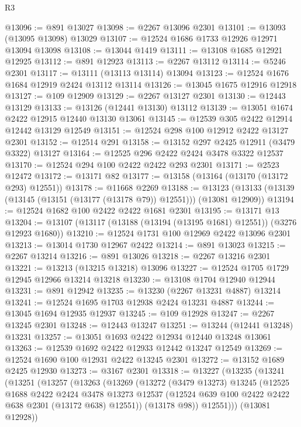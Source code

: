 \begin{lexlean}{R3}
\begin{coremodule}
@13096 := @891 @13027
@13098 := @2267 @13096 @2301
@13101 := @13093 (@13095 @13098) @13029
@13107 := @12524 @1686 @1733 @12926 @12971 @13094 @13098
@13108 := @13044 @1419
@13111 := @13108 @1685 @12921 @12925
@13112 := @891 @12923
@13113 := @2267 @13112
@13114 := @5246 @2301
@13117 := @13111 (@13113 @13114) @13094
@13123 := @12524 @1676 @1684 @12919 @2424 @13112 @13114
@13126 := @13045 @1675 @12916 @12918
@13127 := @109 @12909
@13129 := @2267 @13127 @2301
@13130 := @12443 @13129
@13133 := @13126 (@12441 @13130) @13112
@13139 := @13051 @1674 @2422 @12915 @12440 @13130 @13061
@13145 := @12539 @305 @2422 @12914 @12442 @13129 @12549
@13151 := @12524 @298 @100 @12912 @2422 @13127 @2301
@13152 := @12514 @291
@13158 := @13152 @297 @2425 @12911 (@3479 @3322) @13127
@13164 := @12525 @296 @2422 @2424 @3478 @3322 @12537
@13170 := @12524 @294 @100 @2422 @2422 @293 @2301
@13171 := @2523 @12472
@13172 := @13171 @82
@13177 := @13158 (@13164 (@13170 (@13172 @293) @12551))
@13178 := @11668 @2269
@13188 := @13123 (@13133 (@13139 (@13145 (@13151 (@13177 (@13178 @79)) @12551))) (@13081 @12909))
@13194 := @12524 @1682 @100 @2422 @2422 @1681 @2301
@13195 := @13171 @13
@13204 := @13107 (@13117 (@13188 (@13194 (@13195 @1681) @12551)) (@3276 @12923 @1680))
@13210 := @12524 @1731 @100 @12969 @2422 @13096 @2301
@13213 := @13014 @1730 @12967 @2422
@13214 := @891 @13023
@13215 := @2267 @13214
@13216 := @891 @13026
@13218 := @2267 @13216 @2301
@13221 := @13213 (@13215 @13218) @13096
@13227 := @12524 @1705 @1729 @12945 @12966 @13214 @13218
@13230 := @13108 @1704 @12940 @12944
@13231 := @891 @12942
@13235 := @13230 (@2267 @13231 @4887) @13214
@13241 := @12524 @1695 @1703 @12938 @2424 @13231 @4887
@13244 := @13045 @1694 @12935 @12937
@13245 := @109 @12928
@13247 := @2267 @13245 @2301
@13248 := @12443 @13247
@13251 := @13244 (@12441 @13248) @13231
@13257 := @13051 @1693 @2422 @12934 @12440 @13248 @13061
@13263 := @12539 @1692 @2422 @12933 @12442 @13247 @12549
@13269 := @12524 @1690 @100 @12931 @2422 @13245 @2301
@13272 := @13152 @1689 @2425 @12930
@13273 := @3167 @2301
@13318 := @13227
    (@13235
      (@13241
        (@13251
          (@13257
            (@13263
              (@13269
                (@13272
                  (@3479 @13273)
                  @13245
                  (@12525
                    @1688
                    @2422
                    @2424
                    @3478
                    @13273
                    @12537
                    (@12524 @639 @100 @2422 @2422 @638 @2301 (@13172 @638) @12551))
                  (@13178 @98))
                @12551)))
          (@13081 @12928))

\end{coremodule}
\end{lexlean}
